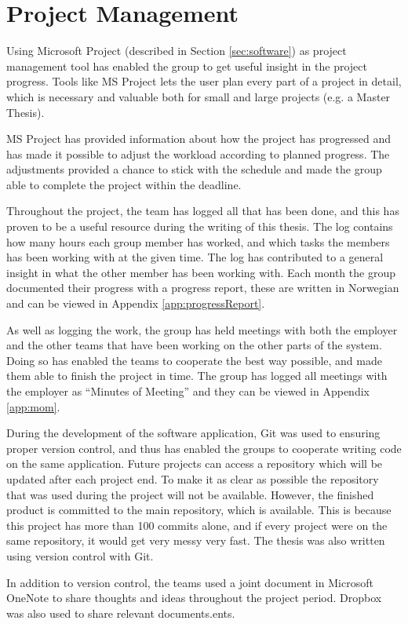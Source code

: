 \chapter{Project Management}
\label{cha:projectmanagement}
Using Microsoft Project (described in Section \ref{sec:software}) as project management tool has enabled the group to get useful insight in the project progress. Tools like MS Project lets the user plan every part of a project in detail, which is necessary and valuable both for small and large projects (e.g. a Master Thesis).

MS Project has provided information about how the project has progressed and has made it possible to adjust the workload according to planned progress. The adjustments provided a chance to stick with the schedule and made the group able to complete the project within the deadline.

Throughout the project, the team has logged all that has been done, and this has proven to be a useful resource during the writing of this thesis. The log contains how many hours each group member has worked, and which tasks the members has been working with at the given time. The log has contributed to a general insight in what the other member has been working with. Each month the group documented their progress with a progress report, these are written in Norwegian and can be viewed in Appendix \ref{app:progressReport}.

As well as logging the work, the group has held meetings with both the employer and the other teams that have been working on the other parts of the system. Doing so has enabled the teams to cooperate the best way possible, and made them able to finish the project in time. The group has logged all meetings with the employer as ``Minutes of Meeting'' and they can be viewed in Appendix \ref{app:mom}.

During the development of the software application, Git was used to ensuring proper version control, and thus has enabled the groups to cooperate writing code on the same application. Future projects can access a repository which will be updated after each project end. To make it as clear as possible the repository that was used during the project will not be available. However, the finished product is committed to the main repository, which is available. This is because this project has more than 100 commits alone, and if every project were on the same repository, it would get very messy very fast. The thesis was also written using version control with Git.

In addition to version control, the teams used a joint document in Microsoft OneNote to share thoughts and ideas throughout the project period. Dropbox was also used to share relevant documents.ents.